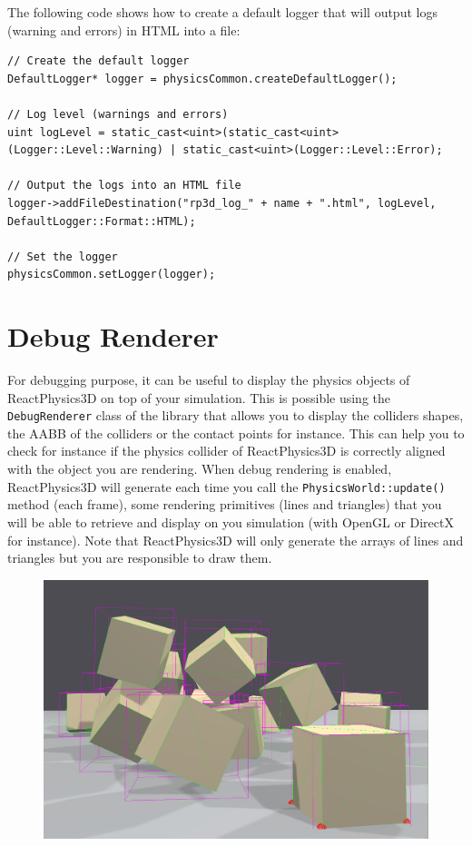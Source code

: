 \documentclass[a4paper,12pt]{article}
\begin{document}
    The following code shows how to create a default logger that will output logs (warning and errors) in HTML into a file: \\

    \begin{lstlisting}
// Create the default logger
DefaultLogger* logger = physicsCommon.createDefaultLogger();

// Log level (warnings and errors)
uint logLevel = static_cast<uint>(static_cast<uint>(Logger::Level::Warning) | static_cast<uint>(Logger::Level::Error);

// Output the logs into an HTML file
logger->addFileDestination("rp3d_log_" + name + ".html", logLevel, DefaultLogger::Format::HTML);

// Set the logger
physicsCommon.setLogger(logger);
    \end{lstlisting}

   \section{Debug Renderer}
  
  \begin{sloppypar}
   For debugging purpose, it can be useful to display the physics objects of ReactPhysics3D on top of your simulation. This is possible using the
   \texttt{DebugRenderer} class of the library that allows you to display the colliders shapes, the AABB of the colliders or the contact points for
   instance. This can help you to check for instance if the physics collider of ReactPhysics3D is correctly aligned with the object you are rendering.
   When debug rendering is enabled, ReactPhysics3D will generate each time you call the \texttt{PhysicsWorld::update()} method (each frame), some rendering
   primitives (lines and triangles) that you will be able to retrieve and display on you simulation (with OpenGL or DirectX for instance). Note that
   ReactPhysics3D will only generate the arrays of lines and triangles but you are responsible to draw them. \\
  \end{sloppypar}

  \begin{figure}[!ht]
      \centering
      \includegraphics[scale=0.25]{DebugRendering.png}
       \label{fig:debugrendering}
  \end{figure}
\end{document}
